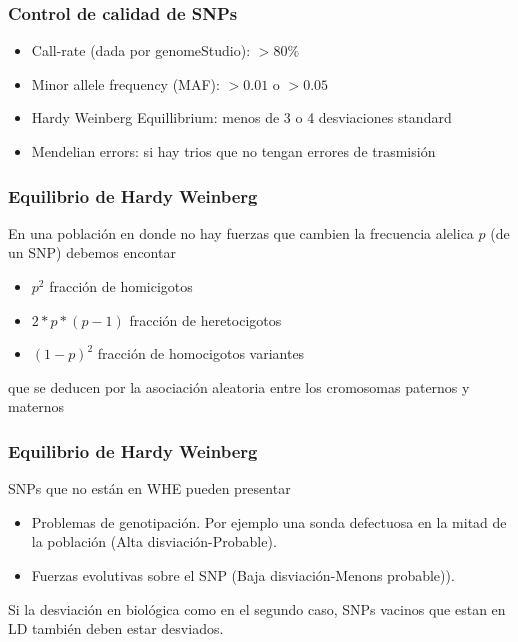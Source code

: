 \documentclass{beamer}\usepackage[]{graphicx}\usepackage[]{color}
\begin{document}
\begin{frame}[fragile]
\frametitle{Control de calidad de SNPs}

\begin{itemize}
\item Call-rate (dada por genomeStudio): $>80\%$
\item Minor allele frequency (MAF): $>0.01$ o $>0.05$
\item Hardy Weinberg Equillibrium: menos de 3 o 4 desviaciones standard 
\item Mendelian errors: si hay trios que no tengan errores de trasmisi\'on
\end{itemize}

\end{frame}

\begin{frame}[fragile]
\frametitle{Equilibrio de Hardy Weinberg}

En una poblaci\'on en donde no hay fuerzas que cambien la frecuencia alelica $p$ (de un SNP)
debemos encontar
\begin{itemize}
\item $p^2$ fracci\'on de homicigotos
\item $2*p*(p-1)$ fracci\'on de heretocigotos
\item $(1-p)^2$ fracci\'on de homocigotos variantes
\end{itemize}

que se deducen por la asociaci\'on aleatoria entre los cromosomas paternos y maternos


\end{frame}



\begin{frame}[fragile]
\frametitle{Equilibrio de Hardy Weinberg}

SNPs que no est\'an en WHE pueden presentar

\begin{itemize}
\item Problemas de genotipaci\'on. Por ejemplo una sonda defectuosa en la mitad de la población (Alta disviaci\'on-Probable).
\item Fuerzas evolutivas sobre el SNP (Baja disviaci\'on-Menons probable)).
\end{itemize}

Si la desviación en biol\'ogica como en el segundo caso, SNPs vacinos que estan en LD tambi\'en deben estar desviados. 

\end{frame}
\end{document}
